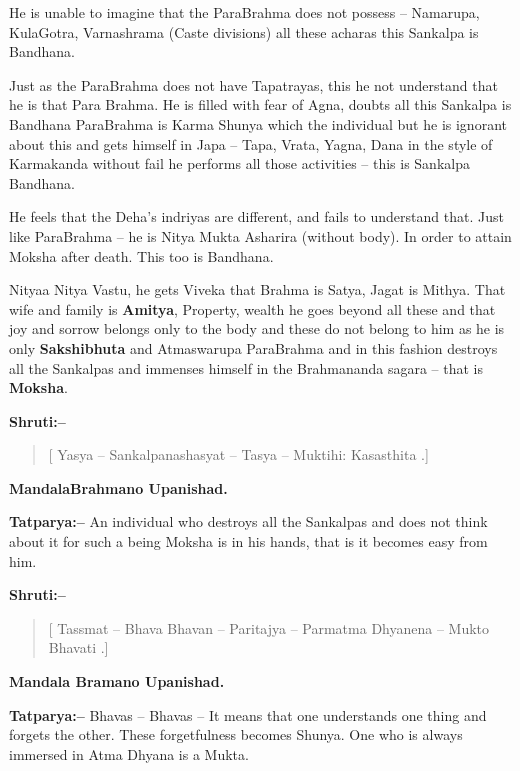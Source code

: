 He is unable to imagine that the ParaBrahma does not possess – Namarupa, KulaGotra, Varnashrama (Caste divisions) all these acharas this Sankalpa is Bandhana. 

Just as the ParaBrahma does not have Tapatrayas, this he not understand that he is that Para Brahma. He is filled with fear of Agna, doubts all this Sankalpa is Bandhana ParaBrahma is Karma Shunya which the individual but he is ignorant about this and gets himself in Japa – Tapa, Vrata, Yagna, Dana in the style of Karmakanda without fail he performs all those activities – this is Sankalpa Bandhana.

He feels that the Deha's indriyas are different, and fails to understand that. Just like ParaBrahma – he is Nitya Mukta Asharira (without body). In order to attain Moksha after death. This too is Bandhana.

Nityaa Nitya Vastu, he gets Viveka that Brahma is Satya, Jagat is Mithya. That wife and family is \textbf{Amitya}, Property, wealth he goes beyond all these and that joy and sorrow belongs only to the body and these do not belong to him as he is only \textbf{Sakshibhuta} and Atmaswarupa ParaBrahma and in this fashion destroys all the Sankalpas and immenses himself in the Brahmananda sagara – that is \textbf{Moksha}.

\textbf{Shruti:–}

\begin{verse}
[ Yasya – Sankalpanashasyat – Tasya – Muktihi: Kasasthita .]
\end{verse}

\begin{flushright}
\textbf{MandalaBrahmano Upanishad.}
\end{flushright}

\textbf{Tatparya:–} An individual who destroys all the Sankalpas and does not think about it for such a being Moksha is in his hands, that is it becomes easy from him.

\textbf{Shruti:–}

\begin{verse}
[ Tassmat – Bhava Bhavan – Paritajya – Parmatma Dhyanena – Mukto Bhavati .]
\end{verse}

\begin{flushright}
\textbf{Mandala Bramano Upanishad.}
\end{flushright}

\textbf{Tatparya:–} Bhavas – Bhavas – It means that one understands one thing and forgets the other. These forgetfulness becomes Shunya. One who is always immersed in Atma Dhyana is a Mukta.

